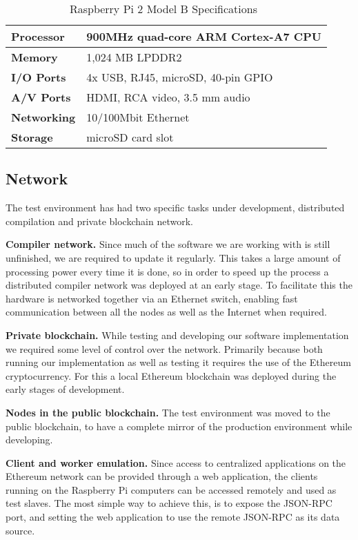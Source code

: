 \begin{table}[h]
\centering
\caption{Raspberry Pi 2 Model B Specifications~\cite{rpi}}
\label{rpi}
\begin{tabular}{|l|l|}
\hline \textbf{Processor} & 900MHz quad-core ARM Cortex-A7 CPU \\ \hline
\textbf{Memory} & 1,024 MB LPDDR2 \\ \hline 
\textbf{I/O Ports} & 4x USB, RJ45, microSD, 40-pin GPIO \\ \hline
\textbf{A/V Ports} & HDMI, RCA video, 3.5 mm audio \\ \hline
\textbf{Networking} & 10/100Mbit Ethernet \\ \hline
\textbf{Storage} & microSD card slot \\ \hline
\end{tabular}
\end{table}

\subsection{Network}
The test environment has had two specific tasks under development, distributed compilation and private blockchain network.

\textbf{Compiler network.} Since much of the software we are working with is still unfinished, we are required to update it regularly. This takes a large amount of processing power every time it is done, so in order to speed up the process a distributed compiler network was deployed at an early stage. To facilitate this the hardware is networked together via an Ethernet switch, enabling fast communication between all the nodes as well as the Internet when required. 

\textbf{Private blockchain.} While testing and developing our software implementation we required some level of control over the network. Primarily because both running our implementation as well as testing it requires the use of the Ethereum cryptocurrency. For this a local Ethereum blockchain was deployed during the early stages of development.

\textbf{Nodes in the public blockchain.} The test environment was moved to the public blockchain, to have a complete mirror of the production environment while developing.

\textbf{Client and worker emulation.} Since access to centralized applications on the Ethereum network can be provided through a web application, the clients running on the Raspberry Pi computers can be accessed remotely and used as test slaves. The most simple way to achieve this, is to expose the JSON-RPC port, and setting the web application to use the remote JSON-RPC as its data source.
